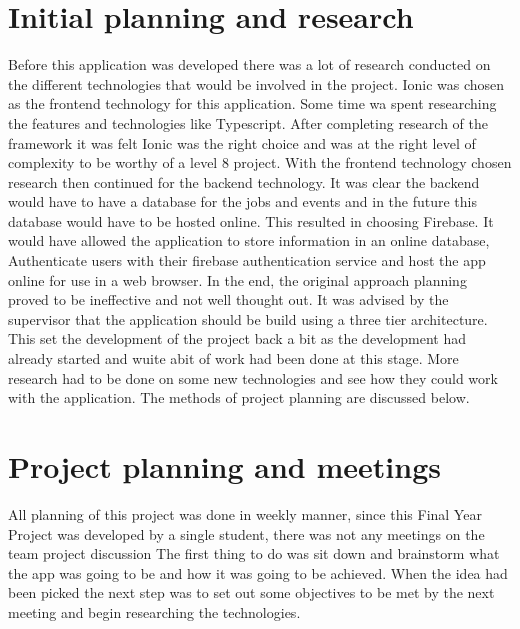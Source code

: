 \section{Initial planning and research}
Before this application was developed there was a lot of research conducted on the different technologies that would be involved in the project. Ionic was chosen as the frontend technology for this application. Some time wa spent researching the features and technologies like Typescript. After completing research of the framework it was felt Ionic was the right choice and was at the right level of complexity to be worthy of a level 8 project.
With the frontend technology chosen research then continued for the backend technology. It was clear the backend would have to have a database for the jobs and events and in the future this database would have to be hosted online. This resulted in choosing Firebase. It would have allowed the application to store information in an online database, Authenticate users with their firebase authentication service and host the app online for use in a web browser.
In the end, the original approach planning proved to be ineffective and not well thought out. It was advised by the supervisor that the application should be build using a three tier architecture. This set the development of the project back a bit  as the development had already started and wuite abit of work had been done at this stage. More research had to be done on some new technologies and see how they could work with the application. The methods of project planning are discussed below.

\section{Project planning and meetings}
All planning of this project was done in weekly manner, since this Final Year Project was developed by a single student, there was not any meetings on the team project discussion The first thing to do was sit down and brainstorm what the app was going to be and how it was going to be achieved. When the idea had been picked the next step was to set out some objectives to be met by the next meeting and begin researching the technologies.

